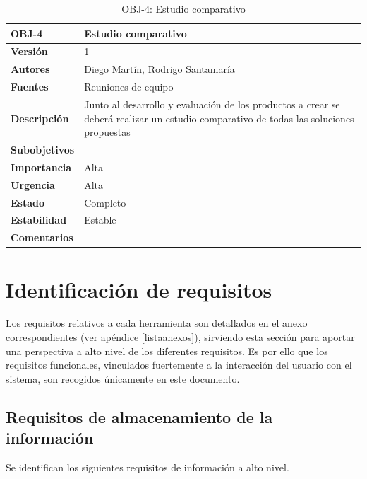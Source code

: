 \begin{table}[H]
\begin{tabular}{|p{2.5cm}|p{10cm}|}
\hline
\textbf{OBJ-4} &Estudio comparativo\\
\hline
\textbf{Versión} &1\\
\hline
\textbf{Autores} &Diego Martín, Rodrigo Santamaría\\
\hline
\textbf{Fuentes} &Reuniones de equipo\\
\hline
\textbf{Descripción} &Junto al desarrollo y evaluación de los productos a crear se deberá realizar un estudio comparativo de todas las soluciones propuestas\\
\hline
\textbf{Subobjetivos} &\\
\hline
\textbf{Importancia} &Alta\\
\hline
\textbf{Urgencia} &Alta\\
\hline
\textbf{Estado} &Completo\\
\hline
\textbf{Estabilidad} &Estable\\
\hline
\textbf{Comentarios} &\\
\hline
\end{tabular}
\caption{OBJ-4: Estudio comparativo}
\end{table}

\section{Identificación de requisitos}

Los requisitos relativos a cada herramienta son detallados en el anexo correspondientes (ver apéndice \ref{listaanexos}), sirviendo esta sección para aportar una perspectiva a alto nivel de los diferentes requisitos. Es por ello que los requisitos funcionales, vinculados fuertemente a la interacción del usuario con el sistema, son recogidos únicamente en este documento.

\subsection{Requisitos de almacenamiento de la información}

Se identifican los siguientes requisitos de información a alto nivel.

